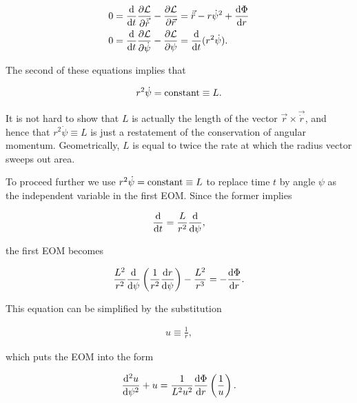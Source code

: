 \documentclass[a4paper,10pt]{article}
\begin{document}
\begin{align*}
    0 &= \frac{{\rm d}}{{\rm d}t}\frac{\partial\mathcal{L}}{\partial\vec{\dot{r}}} - \frac{\partial\mathcal{L}}{\partial\vec{r}} = \vec{\ddot{r}} - r\dot{\psi}^2 + \frac{{\rm d}\Phi}{{\rm d}r} \\
    0 &= \frac{{\rm d}}{{\rm d}t}\frac{\partial\mathcal{L}}{\partial\dot{\psi}} - \frac{\partial\mathcal{L}}{\partial\psi} = \frac{{\rm d}}{{\rm d}t}(r^2\dot{\psi}).
\end{align*}

{\noindent}The second of these equations implies that

\begin{align*}
    r^2\dot{\psi} = {\rm constant} \equiv L.
\end{align*}

{\noindent}It is not hard to show that $L$ is actually the length of the vector $\vec{r}\times\vec{\dot{r}}$, and hence that $r^2\dot{\psi}\equiv L$ is just a restatement of the conservation of angular momentum. Geometrically, $L$ is equal to twice the rate at which the radius vector sweeps out area.

{\noindent}To proceed further we use $r^2\dot{\psi} = {\rm constant} \equiv L$ to replace time $t$ by angle $\psi$ as the independent variable in the first EOM. Since the former implies

\begin{align*}
    \frac{{\rm d}}{{\rm d}t} = \frac{L}{r^2}\frac{{\rm d}}{{\rm d}\psi},
\end{align*}

{\noindent}the first EOM becomes

\begin{align*}
    \frac{L^2}{r^2}\frac{{\rm d}}{{\rm d}\psi} \left(\frac{1}{r^2}\frac{{\rm d}r}{{\rm d}\psi}\right) - \frac{L^2}{r^3} = -\frac{{\rm d}\Phi}{{\rm d}r}.
\end{align*}

{\noindent}This equation can be simplified by the substitution

\begin{align*}
    u\equiv\frac{1}{r},
\end{align*}

{\noindent}which puts the EOM into the form

\begin{align*}
    \frac{{\rm d}^2u}{{\rm d}\psi^2} + u = \frac{1}{L^2u^2}\frac{{\rm d}\Phi}{{\rm d}r}\left(\frac{1}{u}\right).
\end{align*}
\end{document}
